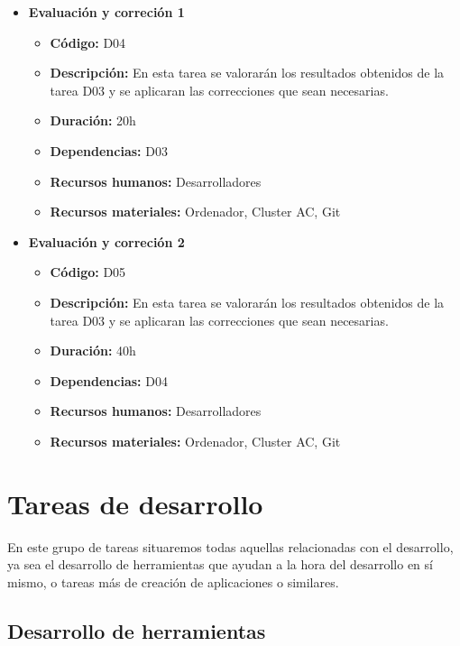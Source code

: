 \begin{itemize}
\begin{itemize}
        \end{itemize}
    \item \textbf{Evaluación y correción 1}
        \begin{itemize}
            \item \textbf{Código:} D04
            \item \textbf{Descripción:} En esta tarea se valorarán los resultados obtenidos de la tarea D03 y se aplicaran las correcciones que sean
                necesarias.
            \item \textbf{Duración:} 20h
            \item \textbf{Dependencias:} D03
            \item \textbf{Recursos humanos:} Desarrolladores
            \item \textbf{Recursos materiales:} Ordenador, Cluster AC, Git
        \end{itemize}
    \item \textbf{Evaluación y correción 2}
        \begin{itemize}
            \item \textbf{Código:} D05
            \item \textbf{Descripción:} En esta tarea se valorarán los resultados obtenidos de la tarea D03 y se aplicaran las correcciones que sean
                necesarias.
            \item \textbf{Duración:} 40h
            \item \textbf{Dependencias:} D04
            \item \textbf{Recursos humanos:} Desarrolladores
            \item \textbf{Recursos materiales:} Ordenador, Cluster AC, Git
        \end{itemize}
\end{itemize}

\section{Tareas de desarrollo}
\label{sec:tareas_desarrollo}


En este grupo de tareas situaremos todas aquellas relacionadas con el desarrollo, ya sea el desarrollo de herramientas que ayudan a la hora del desarrollo en
sí mismo, o tareas más de creación de aplicaciones o similares.

\subsection{Desarrollo de herramientas}
\label{subsec:tareas_herramientas}

